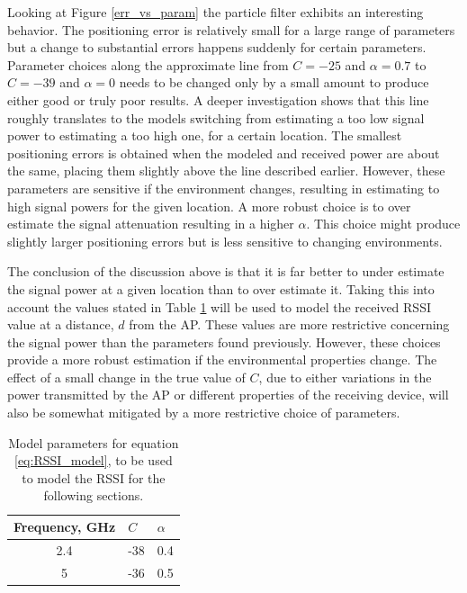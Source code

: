 \documentclass{LTHthesis}
\begin{document}
Looking at Figure \ref{err_vs_param} the particle filter exhibits an interesting behavior. The positioning error is relatively small for a large range of parameters but a change to substantial errors happens suddenly for certain parameters. Parameter choices along the approximate line from $C=-25$ and $\alpha=0.7$ to $C=-39$ and $\alpha=0$ needs to be changed only by a small amount to produce either good or truly poor results. A deeper investigation shows that this line roughly translates to the models switching from estimating a too low signal power to estimating a too high one, for a certain location. The smallest positioning errors is obtained when the modeled and received power are about the same, placing them slightly above the line described earlier. However, these parameters are sensitive if the environment changes, resulting in estimating to high signal powers for the given location. A more robust choice is to over estimate the signal attenuation resulting in a higher $\alpha$. This choice might produce slightly larger positioning errors but is less sensitive to changing environments.

The conclusion of the discussion above is that it is far better to under estimate the signal power at a given location than to over estimate it. Taking this into account the values stated in Table \ref{table:model_par} will be used to model the received RSSI value at a distance, $d$ from the AP.  These values are more restrictive concerning the signal power than the parameters found previously. However, these choices provide a more robust estimation if the environmental properties change. The effect  of a small change in the true value of $C$, due to either variations in the power transmitted by the AP or different properties of the receiving device, will also be somewhat mitigated by a more restrictive choice of parameters.  
%
\begin{table}
\begin{center}
\begin{tabular}{|c|l|l|}
\hline
Frequency, GHz & $C$ & $\alpha$ \\
\hline
2.4 & -38 & 0.4 \\
\hline
5 & -36 & 0.5 \\
\hline
\end{tabular}
\end{center}
\caption{Model parameters for equation \ref{eq:RSSI_model}, to be used to model the RSSI for the following sections.}\label{table:model_par}
\end{table}
  
\end{document}
